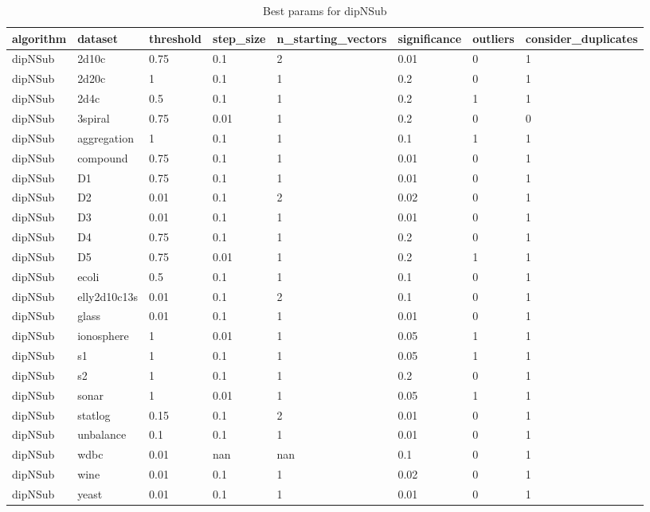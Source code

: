 \begin{table}[H]
\centering
\caption{Best params for dipNSub}
\label{tab:params:dipNSub}
\begin{tabular}{|l|l|l|l|l|l|l|l|}
\hline
algorithm & dataset & threshold & step\_size & n\_starting\_vectors & significance & outliers & consider\_duplicates \\
\hline
dipNSub & 2d10c & 0.75 & 0.1 & 2 & 0.01 & 0 & 1 \\
\hline
dipNSub & 2d20c & 1 & 0.1 & 1 & 0.2 & 0 & 1 \\
\hline
dipNSub & 2d4c & 0.5 & 0.1 & 1 & 0.2 & 1 & 1 \\
\hline
dipNSub & 3spiral & 0.75 & 0.01 & 1 & 0.2 & 0 & 0 \\
\hline
dipNSub & aggregation & 1 & 0.1 & 1 & 0.1 & 1 & 1 \\
\hline
dipNSub & compound & 0.75 & 0.1 & 1 & 0.01 & 0 & 1 \\
\hline
dipNSub & D1 & 0.75 & 0.1 & 1 & 0.01 & 0 & 1 \\
\hline
dipNSub & D2 & 0.01 & 0.1 & 2 & 0.02 & 0 & 1 \\
\hline
dipNSub & D3 & 0.01 & 0.1 & 1 & 0.01 & 0 & 1 \\
\hline
dipNSub & D4 & 0.75 & 0.1 & 1 & 0.2 & 0 & 1 \\
\hline
dipNSub & D5 & 0.75 & 0.01 & 1 & 0.2 & 1 & 1 \\
\hline
dipNSub & ecoli & 0.5 & 0.1 & 1 & 0.1 & 0 & 1 \\
\hline
dipNSub & elly2d10c13s & 0.01 & 0.1 & 2 & 0.1 & 0 & 1 \\
\hline
dipNSub & glass & 0.01 & 0.1 & 1 & 0.01 & 0 & 1 \\
\hline
dipNSub & ionosphere & 1 & 0.01 & 1 & 0.05 & 1 & 1 \\
\hline
dipNSub & s1 & 1 & 0.1 & 1 & 0.05 & 1 & 1 \\
\hline
dipNSub & s2 & 1 & 0.1 & 1 & 0.2 & 0 & 1 \\
\hline
dipNSub & sonar & 1 & 0.01 & 1 & 0.05 & 1 & 1 \\
\hline
dipNSub & statlog & 0.15 & 0.1 & 2 & 0.01 & 0 & 1 \\
\hline
dipNSub & unbalance & 0.1 & 0.1 & 1 & 0.01 & 0 & 1 \\
\hline
dipNSub & wdbc & 0.01 & nan & nan & 0.1 & 0 & 1 \\
\hline
dipNSub & wine & 0.01 & 0.1 & 1 & 0.02 & 0 & 1 \\
\hline
dipNSub & yeast & 0.01 & 0.1 & 1 & 0.01 & 0 & 1 \\
\hline
\end{tabular}
\end{table}